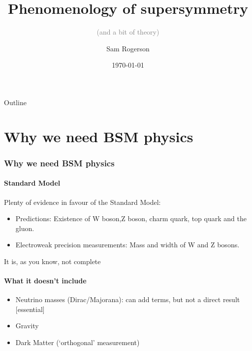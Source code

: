 \documentclass{beamer}
\begin{document}
\title{Phenomenology of supersymmetry}
\subtitle{\textcolor{gray}{(and a bit of theory)}}
\author{Sam Rogerson}
\date{\today}

\begin{frame}[plain]
  \titlepage
\end{frame}

\begin{frame}{Outline}
  \tableofcontents [part=1,hideallsubsections,]
  \tableofcontents [part=2,hideallsubsections,] 
  \tableofcontents [part=3,hideallsubsections,] 
  \tableofcontents [part=4,hideallsubsections,] 
  \tableofcontents [part=5,hideallsubsections,] 
\end{frame}


\part{Why we need BSM physics}
\section{Why we need BSM physics}
\frame{\partpage}
\subsection{Standard Model}
\begin{frame}{\insertsubsection}
  Plenty of evidence in favour of the Standard Model:
  \begin{itemize}
    \item Predictions: Existence of W boson,Z boson, charm quark, top quark and the gluon.
    \item Electroweak precision measurements: Mass and width of W and Z bosons.
  \end{itemize}
  It is, as you know, not complete
\end{frame}

\subsection{What it doesn't include}
\begin{frame}{\insertsubsection}
  \begin{itemize}
    \item Neutrino masses (Dirac/Majorana): can add terms, but not a direct
    result \alert{[essential]}
    \item Gravity
    \item Dark Matter (`orthogonal' measurement)
  \end{itemize}
\end{frame}
\end{document}
